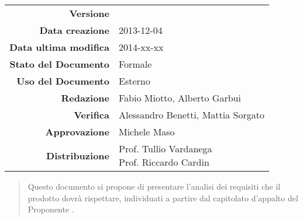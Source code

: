 

\newcommand{\Versione}{\versioneAnalisiDeiRequisiti{}}	%
\newcommand{\Data}{2013-12-04}							%
\newcommand{\DataUltimaModifica}{2014-xx-xx}
\newcommand{\TipoDocumento}{Analisi dei Requisiti}		%






\begin{center}
\begin{tabular}{r|l}
\textbf{Versione} & \Versione{} \\
\textbf{Data creazione} & \Data{} \\
\textbf{Data ultima modifica} & \DataUltimaModifica{} \\
\textbf{Stato del Documento} & Formale \\					%
\textbf{Uso del Documento} & Esterno \\						%
\textbf{Redazione} & Fabio Miotto, Alberto Garbui\\			%
\textbf{Verifica} & Alessandro Benetti, Mattia Sorgato\\	%
\textbf{Approvazione} & Michele Maso\\					    %
\textbf{Distribuzione} & \parbox[t]{4cm}{Prof. Tullio Vardanega \\ Prof. Riccardo Cardin \\ \Prop{} }\\
\end{tabular}
\end{center}

\vspace{0.05in}

\begin{abstract}
\begin{center}
Questo documento si propone di presentare l'analisi dei requisiti che il prodotto \Progetto{} dovrà rispettare, individuati a partire dal capitolato d'appalto del Proponente \Prop{}.
\end{center}
\end{abstract}

